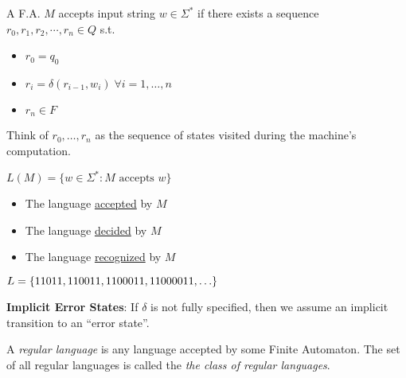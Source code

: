 \begin{definition}
    A F.A. $M$ accepts input string $w \in \Sigma^*$ if there exists a sequence $r_0, r_1, r_2, \cdots, r_n \in Q$ s.t.

    \begin{itemize}
        \item $r_0 = q_0$
        \item $r_i = \delta(r_{i-1}, w_i) \; \forall i = 1, \ldots, n$
        \item $r_n \in F$
    \end{itemize}

    Think of $r_0, \ldots, r_n$ as the sequence of states visited during the machine's computation.

    $L(M) = \{w \in \Sigma^*: M \text{ accepts } w\}$

    \begin{itemize}
        \item The language \underline{accepted} by $M$
        \item The language \underline{decided} by $M$
        \item The language \underline{recognized} by $M$
    \end{itemize}

\end{definition}

$L = \left \{ 11011, 110011, 1100011, 11000011, \ldots \right \}$

\textbf{Implicit Error States}: If $\delta$ is not fully specified, then we assume an implicit transition to an ``error state''.

\begin{definition}
    A \emph{regular language} is any language accepted by some Finite Automaton. The set of all regular languages is called the \emph{the class of regular languages}.
 \end{definition}

\backmatter
